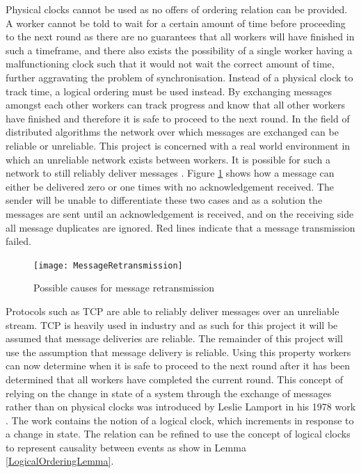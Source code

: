 \documentclass[12pt]{article}
\begin{document}
Physical clocks cannot be used as no offers of ordering relation can be provided. A worker cannot be told to wait for a certain amount of time before proceeding to the next round as there are no guarantees that all workers will have finished in such a timeframe, and there also exists the possibility of a single worker having a malfunctioning clock such that it would not wait the correct amount of time, further aggravating the problem of synchronisation. Instead of a physical clock to track time, a logical ordering must be used instead. By exchanging messages amongst each other workers can track progress and know that all other workers have finished and therefore it is safe to proceed to the next round. In the field of distributed algorithms the network over which messages are exchanged can be reliable or unreliable. This project is concerned with a real world environment in which an unreliable network exists between workers. It is possible for such a network to still reliably deliver messages \cite{afek1994reliable}. Figure \ref{MessageRetransmission} shows how a message can either be delivered zero or one times with no acknowledgement received. The sender will be unable to differentiate these two cases and as a solution the messages are sent until an acknowledgement is received, and on the receiving side all message duplicates are ignored. Red lines indicate that a message transmission failed.

\begin{figure}[H]
  \centering
  \texttt{[image: MessageRetransmission]}
  \caption[]{Possible causes for message retransmission}
  \label{MessageRetransmission}
\end{figure}

Protocols such as TCP are able to reliably deliver messages over an unreliable stream. TCP is heavily used in industry and as such for this project it will be assumed that message deliveries are reliable. The remainder of this project will use the assumption that message delivery is reliable. Using this property workers can now determine when it is safe to proceed to the next round after it has been determined that all workers have completed the current round.
\newline
\newline
This concept of relying on the change in state of a system through the exchange of messages rather than on physical clocks was introduced by Leslie Lamport in his 1978 work  \cite{lamport1978time}. The work contains the notion of a logical clock, which increments in response to a change in state. The  relation can be refined to use the concept of logical clocks to represent causality between events as show in Lemma \ref{LogicalOrderingLemma}.
\end{document}
